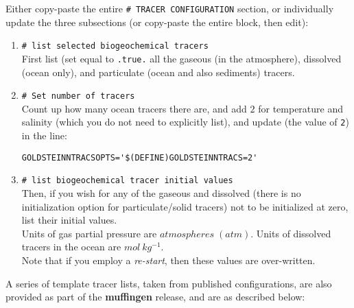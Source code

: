 \documentclass[11pt,fleqn]{book} %
\begin{document}
Either copy-paste the entire \texttt{\# TRACER\ CONFIGURATION} section, or individually update the three subsections (or copy-paste the entire block, then edit):

\begin{enumerate}[noitemsep]
\vspace{1mm}
\item \texttt{\# list selected biogeochemical tracers}
\\First list (set equal to \texttt{.true.} all the gaseous (in the atmosphere), dissolved (ocean only), and particulate (ocean and also sediments) tracers.
\vspace{1mm}
\item \texttt{\# Set number of tracers}
\\Count up how many ocean tracers there are, and add \(2\) for temperature and salinity (which you do not need to explicitly list), and update (the value of \texttt{2}) in the line:
\footnotesize\begin{verbatim}
GOLDSTEINNTRACSOPTS='$(DEFINE)GOLDSTEINNTRACS=2'
\end{verbatim}\normalsize
\vspace{1mm}
\item \texttt{\# list biogeochemical tracer initial values}
\\Then, if you wish for any of the gaseous and dissolved (there is no initialization option for particulate/solid tracers) not to be initialized at zero, list their initial values.
\\Units of gas partial pressure are \(atmospheres \;(atm)\). Units of dissolved tracers in the ocean are \(mol\:kg^{-1}\).
\\Note that if you employ a \textit{re-start}, then these values are over-written.
\end{enumerate}
\vspace{1mm}

A series of template tracer lists, taken from published configurations, are also provided as part of the \textbf{muffingen} release, and are as described below:
\end{document}
